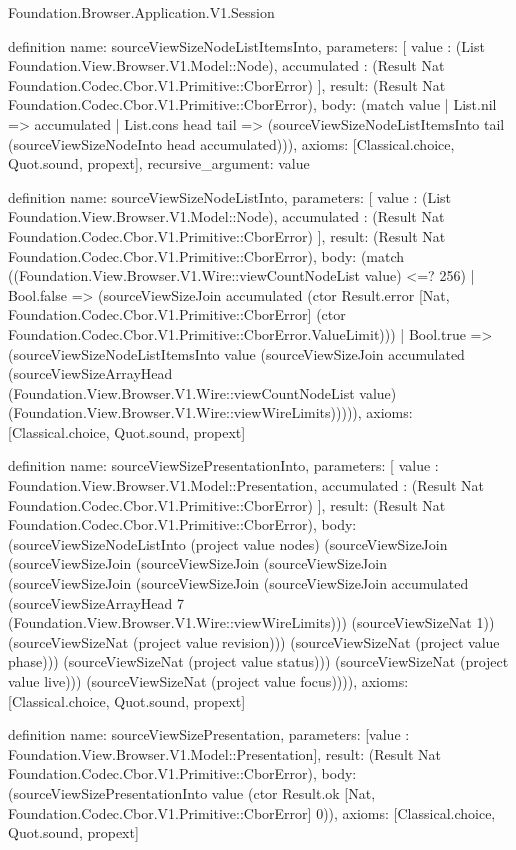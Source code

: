 \begin{lexlean}{Foundation.Browser.Application.V1.Session}
\begin{semanticmodule}
definition{
  name: sourceViewSizeNodeListItemsInto,
  parameters: [
    value : (List Foundation.View.Browser.V1.Model::Node),
    accumulated : (Result Nat Foundation.Codec.Cbor.V1.Primitive::CborError)
  ],
  result: (Result Nat Foundation.Codec.Cbor.V1.Primitive::CborError),
  body: (match value
    | List.nil => accumulated
    | List.cons head tail => (sourceViewSizeNodeListItemsInto tail (sourceViewSizeNodeInto head accumulated))),
  axioms: [Classical.choice, Quot.sound, propext],
  recursive_argument: value
}

definition{
  name: sourceViewSizeNodeListInto,
  parameters: [
    value : (List Foundation.View.Browser.V1.Model::Node),
    accumulated : (Result Nat Foundation.Codec.Cbor.V1.Primitive::CborError)
  ],
  result: (Result Nat Foundation.Codec.Cbor.V1.Primitive::CborError),
  body: (match ((Foundation.View.Browser.V1.Wire::viewCountNodeList value) <=? 256)
    | Bool.false => (sourceViewSizeJoin accumulated (ctor Result.error [Nat, Foundation.Codec.Cbor.V1.Primitive::CborError] (ctor Foundation.Codec.Cbor.V1.Primitive::CborError.ValueLimit)))
    | Bool.true => (sourceViewSizeNodeListItemsInto value (sourceViewSizeJoin accumulated (sourceViewSizeArrayHead (Foundation.View.Browser.V1.Wire::viewCountNodeList value) (Foundation.View.Browser.V1.Wire::viewWireLimits))))),
  axioms: [Classical.choice, Quot.sound, propext]
}

definition{
  name: sourceViewSizePresentationInto,
  parameters: [
    value : Foundation.View.Browser.V1.Model::Presentation,
    accumulated : (Result Nat Foundation.Codec.Cbor.V1.Primitive::CborError)
  ],
  result: (Result Nat Foundation.Codec.Cbor.V1.Primitive::CborError),
  body: (sourceViewSizeNodeListInto (project value nodes) (sourceViewSizeJoin (sourceViewSizeJoin (sourceViewSizeJoin (sourceViewSizeJoin (sourceViewSizeJoin (sourceViewSizeJoin (sourceViewSizeJoin accumulated (sourceViewSizeArrayHead 7 (Foundation.View.Browser.V1.Wire::viewWireLimits))) (sourceViewSizeNat 1)) (sourceViewSizeNat (project value revision))) (sourceViewSizeNat (project value phase))) (sourceViewSizeNat (project value status))) (sourceViewSizeNat (project value live))) (sourceViewSizeNat (project value focus)))),
  axioms: [Classical.choice, Quot.sound, propext]
}

definition{
  name: sourceViewSizePresentation,
  parameters: [value : Foundation.View.Browser.V1.Model::Presentation],
  result: (Result Nat Foundation.Codec.Cbor.V1.Primitive::CborError),
  body: (sourceViewSizePresentationInto value (ctor Result.ok [Nat, Foundation.Codec.Cbor.V1.Primitive::CborError] 0)),
  axioms: [Classical.choice, Quot.sound, propext]
}


\end{semanticmodule}
\end{lexlean}
